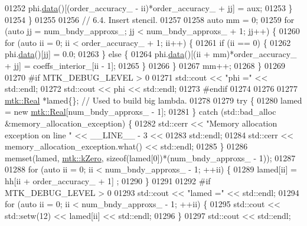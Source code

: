 \begin{DoxyCode}
{{01252         phi.\hyperlink{classmtk_1_1DenseMatrix_a16b3ff56feb2658b9fc7147d1de4d8e7}{data}()[(order\_accuracy\_ - ii)*order\_accuracy\_ + jj] = aux;
01253       \}
01254     \}
01255 
01256     \textcolor{comment}{// 6.4. Insert stencil.}
01257 
01258     \textcolor{keyword}{auto} mm = 0;
01259     \textcolor{keywordflow}{for} (\textcolor{keyword}{auto} jj = num\_bndy\_approxs\_; jj < num\_bndy\_approxs\_ +  1; jj++) \{
01260       \textcolor{keywordflow}{for} (\textcolor{keyword}{auto} ii = 0; ii < order\_accuracy\_ + 1; ii++) \{
01261         \textcolor{keywordflow}{if} (ii == 0) \{
01262           phi.\hyperlink{classmtk_1_1DenseMatrix_a16b3ff56feb2658b9fc7147d1de4d8e7}{data}()[jj] = 0.0;
01263         \} \textcolor{keywordflow}{else} \{
01264           phi.\hyperlink{classmtk_1_1DenseMatrix_a16b3ff56feb2658b9fc7147d1de4d8e7}{data}()[(ii + mm)*order\_accuracy\_ + jj] = coeffs\_interior\_[ii - 1];
01265         \}
01266       \}
01267       mm++;
01268     \}
01269 
01270 \textcolor{preprocessor}{    #if MTK\_DEBUG\_LEVEL > 0}
01271     std::cout << \textcolor{stringliteral}{"phi ="} << std::endl;
01272     std::cout << phi << std::endl;
01273 \textcolor{preprocessor}{    #endif}
01274 
01276 
01277     \hyperlink{group__c01-roots_gac080bbbf5cbb5502c9f00405f894857d}{mtk::Real} *lamed\{\};  \textcolor{comment}{// Used to build big lambda.}
01278 
01279     \textcolor{keywordflow}{try} \{
01280       lamed = \textcolor{keyword}{new} \hyperlink{group__c01-roots_gac080bbbf5cbb5502c9f00405f894857d}{mtk::Real}[num\_bndy\_approxs\_ - 1];
01281     \} \textcolor{keywordflow}{catch} (std::bad\_alloc &memory\_allocation\_exception) \{
01282       std::cerr << \textcolor{stringliteral}{"Memory allocation exception on line "} << \_\_LINE\_\_ - 3 <<
01283         std::endl;
01284       std::cerr << memory\_allocation\_exception.what() << std::endl;
01285     \}
01286     memset(lamed, \hyperlink{group__c01-roots_ga59a451a5fae30d59649bcda274fea271}{mtk::kZero}, \textcolor{keyword}{sizeof}(lamed[0])*(num\_bndy\_approxs\_ - 1));
01287 
01288     \textcolor{keywordflow}{for} (\textcolor{keyword}{auto} ii = 0; ii < num\_bndy\_approxs\_ - 1; ++ii) \{
01289       lamed[ii] = hh[ii + order\_accuracy\_ + 1] ;
01290     \}
01291 
01292 \textcolor{preprocessor}{    #if MTK\_DEBUG\_LEVEL > 0}
01293     std::cout << \textcolor{stringliteral}{"lamed ="} << std::endl;
01294     \textcolor{keywordflow}{for} (\textcolor{keyword}{auto} ii = 0; ii < num\_bndy\_approxs\_ - 1; ++ii) \{
01295       std::cout << std::setw(12) << lamed[ii] << std::endl;
01296     \}
01297     std::cout << std::endl;
}}
\end{DoxyCode}
